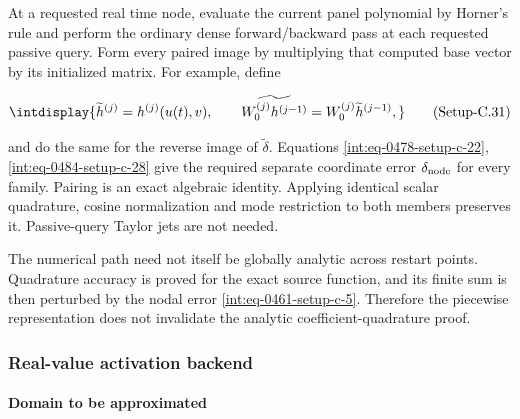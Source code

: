 
At a requested real time node, evaluate the current panel polynomial by Horner's rule and perform the ordinary dense forward/backward pass at each requested passive query. Form every paired image by multiplying that computed base vector by its initialized matrix. For example, define


\label{int:eq-setup-c-31}
\begingroup\renewcommand{\theHequation}{intdisplay.960}
\begin{equation}
\intdisplay{
\widetilde h^{(j)}=h^{(j)}(u(t),v),\qquad
\widetilde{W_0^{(j)}h^{(j-1)}}
=W_0^{(j)}\widetilde h^{(j-1)},
}
\tag{Setup-C.31}
\label{int:eq-0487-setup-c-31}
\end{equation}
\endgroup


and do the same for the reverse image of \(\widetilde\delta\). Equations \hyperref[int:eq-setup-c-22]{\eqref{int:eq-0478-setup-c-22}}, \hyperref[int:eq-setup-c-28]{\eqref{int:eq-0484-setup-c-28}} give the required separate coordinate error \(\delta_{\rm node}\) for every family. Pairing is an exact algebraic identity. Applying identical scalar quadrature, cosine normalization and mode restriction to both members preserves it. Passive-query Taylor jets are not needed.



The numerical path need not itself be globally analytic across restart points. Quadrature accuracy is proved for the exact source function, and its finite sum is then perturbed by the nodal error \hyperref[int:eq-setup-c-5]{\eqref{int:eq-0461-setup-c-5}}. Therefore the piecewise representation does not invalidate the analytic coefficient-quadrature proof.


\subsubsection{Real-value activation backend}
\label{int:setup-activation}

\paragraph{Domain to be approximated}
\label{int:setup-activation-1}
\mbox{}\par\smallskip


